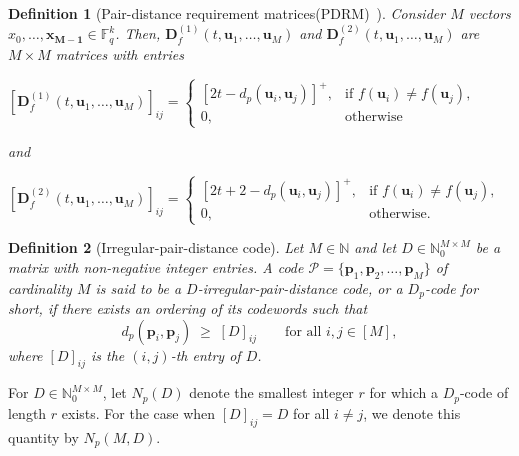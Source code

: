 \documentclass[11pt,draftclsnofoot,journal,onecolumn]{IEEEtran}
\newtheorem{definition}{Definition}
\begin{document}
    
    \begin{definition}[Pair-distance requirement matrices(PDRM)~\cite{xia2024function}]
    \label{def:PDRM}
        Consider $M$ vectors $x_0, \ldots , \boldsymbol{x_{M-1}} \in {\mathbb{F}^k_q}$. Then, 
        $\boldsymbol{D}_f^{(1)}(t, \boldsymbol{u}_1, \dots, \boldsymbol{u}_M)$ and $\boldsymbol{D}_f^{(2)}(t, \boldsymbol{u}_1, \dots, \boldsymbol{u}_M)$ are $M \times M$ matrices with entries

        $[\boldsymbol{D}_f^{(1)}(t, \boldsymbol{u}_1, \dots, \boldsymbol{u}_M)]_{ij} = \begin{cases} [2t - d_p(\boldsymbol{u}_i, \boldsymbol{u}_j)]^+, & \text{if } f(\boldsymbol{u}_i) \neq f(\boldsymbol{u}_j), \\ 0, & \text{otherwise} \end{cases}$

        and

        $[\boldsymbol{D}_f^{(2)}(t, \boldsymbol{u}_1, \dots, \boldsymbol{u}_M)]_{ij} = \begin{cases} [2t + 2 - d_p(\boldsymbol{u}_i, \boldsymbol{u}_j)]^+, & \text{if } f(\boldsymbol{u}_i) \neq f(\boldsymbol{u}_j), \\ 0, & \text{otherwise.} \end{cases}$
    \end{definition}

    \begin{definition}[Irregular-pair-distance code]\label{def:Dp-code}
        Let $M \in \mathbb{N}$ and let $D \in \mathbb{N}_0^{M \times M}$ be a matrix with non-negative integer entries. A code $\mathcal{P} = \{\bm{p}_1, \bm{p}_2, \dots, \bm{p}_M\}$ of cardinality $M$ is said to be a \emph{$D$-irregular-pair-distance code}, or a \emph{$D_p$-code} for short, if there exists an ordering of its codewords such that
        \[
        d_p(\bm{p}_i, \bm{p}_j) \;\geq\; [D]_{ij} \qquad \text{for all } i, j \in [M],
        \]
        where $[D]_{ij}$ is the $(i,j)$-th entry of $D$.
    \end{definition}


    For $D \in \mathbb{N}_0^{M \times M}$, let $N_p(D)$ denote the smallest integer $r$ for which a $D_p$-code of length $r$ exists. For the case when $[D]_{ij} = D$ for all $i \neq j$, we denote this quantity by $N_p(M, D)$.
\end{document}
